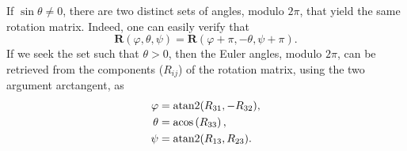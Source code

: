 \documentclass[pdflatex,sn-mathphys-num]{sn-jnl}%
\theoremstyle{thmstyleone}%
\theoremstyle{thmstyletwo}%
\theoremstyle{thmstylethree}%
\DeclareMathOperator{\atantwo}{atan2}
\renewcommand{\vec}[1]{\boldsymbol{#1}}
\begin{document}
\begin{appendices}
If ${\sin\theta \neq 0}$, there are two distinct sets of angles, modulo $2\pi$,  that yield the same rotation matrix. Indeed, one can easily verify that 
\begin{equation}
\vec{R}(\varphi,\theta,\psi) = \vec{R}(\varphi + \pi,-\theta,\psi + \pi).
\end{equation} 
%
If we seek the set such that ${\theta >0}$, then the Euler angles,  modulo $2\pi$, can be retrieved from the components ($R_{ij}$) of the rotation matrix, using the two argument arctangent, as
\begin{align}
	\varphi &= \atantwo(R_{31}, -R_{32}), \notag\\
	\theta &= \acos \left( R_{33} \right), \\
	\psi &= \atantwo(R_{13}, R_{23}). \notag
\end{align}








\end{appendices}
\end{document}
